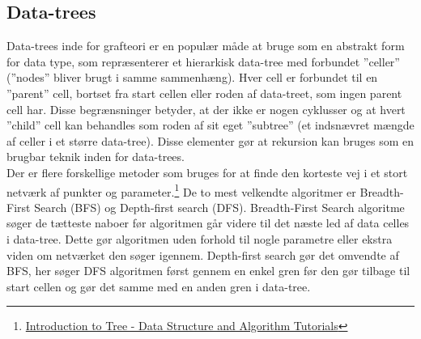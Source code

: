 \documentclass[12pt]{article}
\begin{document}
\subsection{Data-trees}
Data-trees inde for grafteori er en populær måde at bruge som en abstrakt form for data type, som repræsenterer et hierarkisk data-tree med forbundet ”celler” (”nodes” bliver brugt i samme sammenhæng). Hver cell er forbundet til en ”parent” cell, bortset fra start cellen eller roden af data-treet, som ingen parent cell har. Disse begrænsninger betyder, at der ikke er nogen cyklusser og at hvert ”child” cell kan behandles som roden af sit eget ”subtree” (et indsnævret  mængde af celler i et større data-tree). Disse elementer gør at rekursion kan bruges som en brugbar teknik inden for data-trees.\\
Der er flere forskellige metoder som bruges for at finde den korteste vej i et stort netværk af punkter og parameter.\footnote{\href{https://www.geeksforgeeks.org/introduction-to-tree-data-structure-and-algorithm-tutorials/}{Introduction to Tree - Data Structure and Algorithm Tutorials}} De to mest velkendte algoritmer er Breadth-First Search (BFS) og Depth-first search (DFS). 
Breadth-First Search algoritme søger de tætteste naboer før algoritmen går videre til det næste led af data celles i data-tree. Dette gør algoritmen uden forhold til nogle parametre eller ekstra viden om netværket den søger igennem. Depth-first search gør det omvendte af BFS, her søger DFS algoritmen først gennem en enkel gren før den gør tilbage til start cellen og gør det samme med en anden gren i data-tree. 
\begin{figure}[ht]%
  \centering
  \label{fig:datatree}%
\end{figure}
\end{document}
